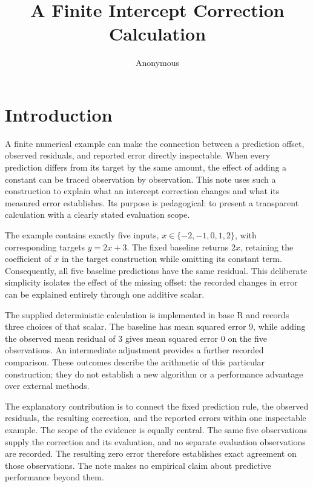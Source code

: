 \documentclass[11pt]{article}
\title{A Finite Intercept Correction Calculation}
\author{Anonymous}
\date{}
\begin{document}
\maketitle
\begin{abstract}
\end{abstract}
\section{Introduction}
A finite numerical example can make the connection between a prediction offset, observed residuals, and reported error directly inspectable. When every prediction differs from its target by the same amount, the effect of adding a constant can be traced observation by observation. This note uses such a construction to explain what an intercept correction changes and what its measured error establishes. Its purpose is pedagogical: to present a transparent calculation with a clearly stated evaluation scope.

The example contains exactly five inputs, \(x\in\{-2,-1,0,1,2\}\), with corresponding targets \(y=2x+3\). The fixed baseline returns \(2x\), retaining the coefficient of \(x\) in the target construction while omitting its constant term. Consequently, all five baseline predictions have the same residual. This deliberate simplicity isolates the effect of the missing offset: the recorded changes in error can be explained entirely through one additive scalar.

The supplied deterministic calculation is implemented in base R and records three choices of that scalar. The baseline has mean squared error \(9\), while adding the observed mean residual of \(3\) gives mean squared error \(0\) on the five observations. An intermediate adjustment provides a further recorded comparison. These outcomes describe the arithmetic of this particular construction; they do not establish a new algorithm or a performance advantage over external methods.

The explanatory contribution is to connect the fixed prediction rule, the observed residuals, the resulting correction, and the reported errors within one inspectable example. The scope of the evidence is equally central. The same five observations supply the correction and its evaluation, and no separate evaluation observations are recorded. The resulting zero error therefore establishes exact agreement on those observations. The note makes no empirical claim about predictive performance beyond them.
\end{document}
